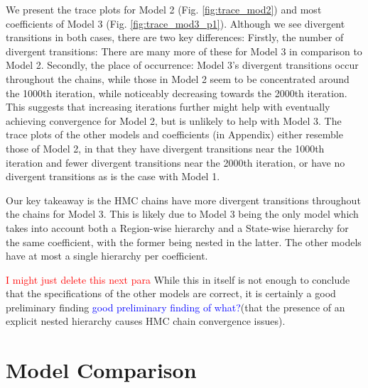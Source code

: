 \documentclass[12pt]{article}
\newcommand{\red}[1]{\textcolor{red}{#1}}
\newcommand{\blue}[1]{\textcolor{blue}{#1}}
\begin{document}

We present the trace plots for Model 2 (Fig. \ref{fig:trace_mod2}) and most coefficients of Model 3 (Fig. \ref{fig:trace_mod3_p1}). Although we see divergent transitions in both cases, there are two key differences:
Firstly, the number of divergent transitions: There are many more of these for Model 3 in comparison to Model 2. Secondly, the place of occurrence: Model 3's divergent transitions occur throughout the chains, while those in Model 2 seem to be concentrated around the 1000th iteration, while noticeably decreasing towards the 2000th iteration. This suggests that increasing iterations further might help with eventually achieving convergence for Model 2, but is unlikely to help with Model 3.
The trace plots of the other models and coefficients (in Appendix) either resemble those of Model 2, in that they have divergent transitions near the 1000th iteration and fewer divergent transitions near the 2000th iteration, 
or have no divergent transitions as is the case with Model 1.

Our key takeaway is the HMC chains have more divergent transitions throughout the chains for Model 3.
This is likely due to Model 3 being the only model which takes into account both a Region-wise hierarchy and a State-wise hierarchy for the same coefficient, with the former being nested in the latter. The other models have at most a single hierarchy per coefficient. 

\red{I might just delete this next para}
While this in itself is not enough to conclude that the specifications of the other models are correct, it is certainly a good preliminary finding \blue{good preliminary finding of what?}(that the presence of an explicit nested hierarchy causes HMC chain convergence issues). 


\section{Model Comparison} \label{sec:comparison}
\end{document}

